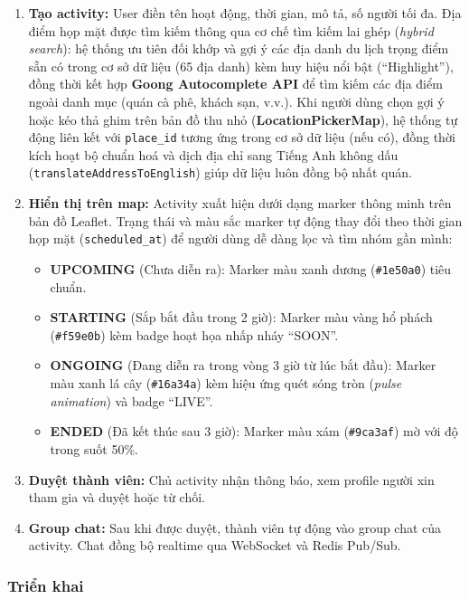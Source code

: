 \documentclass[12pt,a4paper]{article}
\begin{document}
\begin{enumerate}
  \item \textbf{Tạo activity:} User điền tên hoạt động, thời gian, mô tả, số
        người tối đa. Địa điểm họp mặt được tìm kiếm thông qua cơ chế tìm kiếm lai ghép (\textit{hybrid search}):
        hệ thống ưu tiên đối khớp và gợi ý các địa danh du lịch trọng điểm sẵn có trong cơ sở dữ liệu (65 địa danh)
        kèm huy hiệu nổi bật (``Highlight''), đồng thời kết hợp \textbf{Goong Autocomplete API} để tìm kiếm các địa điểm
        ngoài danh mục (quán cà phê, khách sạn, v.v.). Khi người dùng chọn gợi ý hoặc kéo thả ghim trên bản đồ thu nhỏ
        (\textbf{LocationPickerMap}), hệ thống tự động liên kết với \texttt{place\_id} tương ứng trong cơ sở dữ liệu (nếu có),
        đồng thời kích hoạt bộ chuẩn hoá và dịch địa chỉ sang Tiếng Anh không dấu (\texttt{translateAddressToEnglish}) giúp dữ liệu
        luôn đồng bộ nhất quán.
  \item \textbf{Hiển thị trên map:} Activity xuất hiện dưới dạng marker thông minh trên bản
        đồ Leaflet. Trạng thái và màu sắc marker tự động thay đổi theo thời gian họp mặt (\texttt{scheduled\_at})
        để người dùng dễ dàng lọc và tìm nhóm gần mình:
        \begin{itemize}
          \item \textbf{UPCOMING} (Chưa diễn ra): Marker màu xanh dương (\texttt{\#1e50a0}) tiêu chuẩn.
          \item \textbf{STARTING} (Sắp bắt đầu trong 2 giờ): Marker màu vàng hổ phách (\texttt{\#f59e0b}) kèm badge hoạt họa nhấp nháy ``SOON''.
          \item \textbf{ONGOING} (Đang diễn ra trong vòng 3 giờ từ lúc bắt đầu): Marker màu xanh lá cây (\texttt{\#16a34a}) kèm hiệu ứng quét sóng tròn (\textit{pulse animation}) và badge ``LIVE''.
          \item \textbf{ENDED} (Đã kết thúc sau 3 giờ): Marker màu xám (\texttt{\#9ca3af}) mờ với độ trong suốt 50\%.
        \end{itemize}
  \item \textbf{Duyệt thành viên:} Chủ activity nhận thông báo, xem profile
        người xin tham gia và duyệt hoặc từ chối.
  \item \textbf{Group chat:} Sau khi được duyệt, thành viên tự động vào group
        chat của activity. Chat đồng bộ realtime qua WebSocket và Redis Pub/Sub.
\end{enumerate}

\subsubsection{Triển khai}
\end{document}
